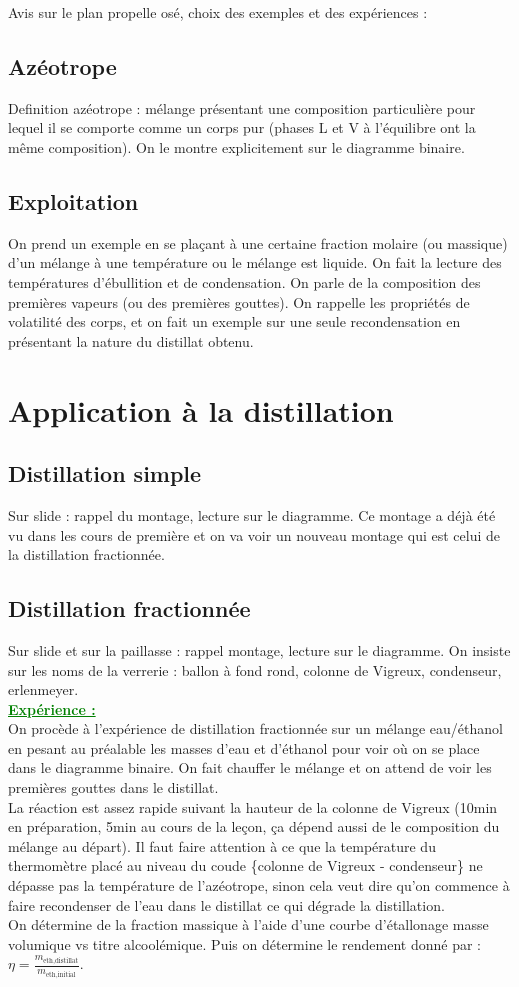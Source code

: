 \begin{reportBlock}{Avis sur le plan propelle osé, choix des exemples et des expériences : }
\subsection{Azéotrope}
Definition azéotrope : mélange présentant une composition particulière pour lequel il se comporte comme un corps pur (phases L et V à l'équilibre ont la même composition). On le montre explicitement sur le diagramme binaire.
\subsection{Exploitation}
On prend un exemple en se plaçant à une certaine fraction molaire (ou massique) d'un mélange à une température ou le mélange est liquide. On fait la lecture des températures d'ébullition et de condensation. On parle de la composition des premières vapeurs (ou des premières gouttes). On rappelle les propriétés de volatilité des corps, et on fait un exemple sur une seule recondensation en présentant la nature du distillat obtenu.
\section{Application à la distillation}
\subsection{Distillation simple}
Sur slide : rappel du montage, lecture sur le diagramme. Ce montage a déjà été vu dans les cours de première et on va voir un nouveau montage qui est celui de la distillation fractionnée.
\subsection{Distillation fractionnée}
Sur slide et sur la paillasse : rappel montage, lecture sur le diagramme. On insiste sur les noms de la verrerie : ballon à fond rond, colonne de Vigreux, condenseur, erlenmeyer.\\

\textcolor{green}{\textbf{\underline{Expérience :}}}\\


On procède à l'expérience de distillation fractionnée sur un mélange eau/éthanol en pesant au préalable les masses d'eau et d'éthanol pour voir où on se place dans le diagramme binaire. On fait chauffer le mélange et on attend de voir les premières gouttes dans le distillat.\\
La réaction est assez rapide suivant la hauteur de la colonne de Vigreux (10min en préparation, 5min au cours de la leçon, ça dépend aussi de le composition du mélange au départ). Il faut faire attention à ce que la température du thermomètre placé au niveau du coude \{colonne de Vigreux - condenseur\} ne dépasse pas la température de l'azéotrope, sinon cela veut dire qu'on commence à faire recondenser de l'eau dans le distillat ce qui dégrade la distillation.\\
On détermine de la fraction massique à l'aide d'une courbe d'étallonage masse volumique vs titre alcoolémique. Puis on détermine le rendement donné par : $\eta=\frac{m_{\text{eth,distillat}}}{m_{\text{eth,initial}}}$.

\end{reportBlock}
